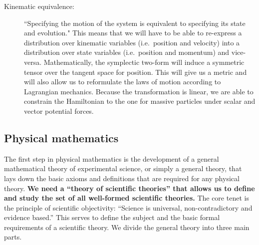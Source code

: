\documentclass[11pt,letterpaper,fleqn]{memoir} %
\begin{document}
\begin{description}
	\item[Kinematic equivalence:] ``Specifying the motion of the system is equivalent to specifying its state and evolution." This means that we will have to be able to re-express a distribution over kinematic variables (i.e.~position and velocity) into a distribution over state variables (i.e.~position and momentum) and vice-versa. Mathematically, the symplectic two-form will induce a symmetric tensor over the tangent space for position. This will give us a metric and will also allow us to reformulate the laws of motion according to Lagrangian mechanics. Because the transformation is linear, we are able to constrain the Hamiltonian to the one for massive particles under scalar and vector potential forces.
\end{description}


\subsection{Physical mathematics}

The first step in physical mathematics is the development of a general mathematical theory of experimental science, or simply a general theory, that lays down the basic axioms and definitions that are required for any physical theory. \textbf{We need a ``theory of scientific theories'' that allows us to define and study the set of all well-formed scientific theories.} The core tenet is the principle of scientific objectivity: ``Science is universal, non-contradictory and evidence based.'' This serves to define the subject and the basic formal requirements of a scientific theory. We divide the general theory into three main parts.
\end{document}
